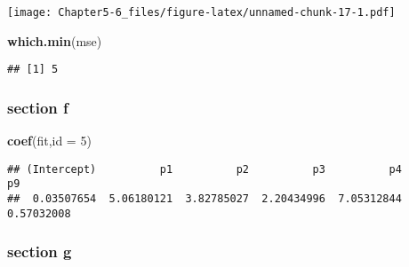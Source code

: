 \documentclass[
]{article}
\newenvironment{Shaded}{\begin{snugshade}}{\end{snugshade}}
\newcommand{\AttributeTok}[1]{\textcolor[rgb]{0.13,0.29,0.53}{#1}}
\newcommand{\ControlFlowTok}[1]{\textcolor[rgb]{0.13,0.29,0.53}{\textbf{#1}}}
\newcommand{\DecValTok}[1]{\textcolor[rgb]{0.00,0.00,0.81}{#1}}
\newcommand{\FunctionTok}[1]{\textcolor[rgb]{0.13,0.29,0.53}{\textbf{#1}}}
\newcommand{\NormalTok}[1]{#1}
\newcommand{\OtherTok}[1]{\textcolor[rgb]{0.56,0.35,0.01}{#1}}
\newcommand{\SpecialCharTok}[1]{\textcolor[rgb]{0.81,0.36,0.00}{\textbf{#1}}}
\newcommand{\StringTok}[1]{\textcolor[rgb]{0.31,0.60,0.02}{#1}}
\begin{document}
\begin{Shaded}
\end{Shaded}

\texttt{[image: Chapter5-6\_files/figure-latex/unnamed-chunk-17-1.pdf]}

\begin{Shaded}
\begin{Highlighting}[]
\FunctionTok{which.min}\NormalTok{(mse)}
\end{Highlighting}
\end{Shaded}

\begin{verbatim}
## [1] 5
\end{verbatim}

\subsubsection{section f}\label{section-f}

\begin{Shaded}
\begin{Highlighting}[]
\FunctionTok{coef}\NormalTok{(fit,}\AttributeTok{id =} \DecValTok{5}\NormalTok{)}
\end{Highlighting}
\end{Shaded}

\begin{verbatim}
## (Intercept)          p1          p2          p3          p4          p9 
##  0.03507654  5.06180121  3.82785027  2.20434996  7.05312844  0.57032008
\end{verbatim}

\subsubsection{section g}\label{section-g}
\end{document}

